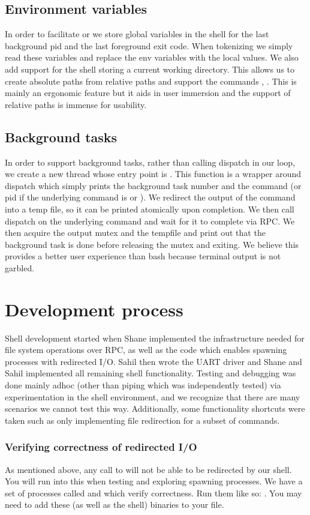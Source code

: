 \subsection{Environment variables}
In order to facilitate \cl{$!} or  we store global variables in the shell for the last background
pid and the last foreground exit code. When tokenizing we simply read these variables and replace the env variables
with the local values. We also add support for the shell storing a current working directory. This allows us
to create absolute paths from relative paths and support the commands , . This is 
mainly an ergonomic feature but it aids in user immersion and the support of relative paths is immense for 
usability. 


\subsection{Background tasks}
\label{sec:background-tasks}
In order to support background tasks, rather than calling dispatch in our loop, we create a new thread whose 
entry point is . This function is a wrapper around dispatch which simply prints 
the background task number and the command (or pid if the underlying command is  or ).
We redirect the output of the command into a temp file, so it can be printed atomically upon completion. We
then call dispatch on the underlying command and wait for it to complete via RPC. We then acquire the output mutex and  the tempfile
and print out that the background task is done before releasing the mutex and exiting. We believe this provides
a better user experience than bash because terminal output is not garbled.

\section{Development process}
Shell development started when Shane implemented the infrastructure needed for file system 
operations over RPC, as well as the code which enables spawning processes with redirected I/O. Sahil
then wrote the UART driver and Shane and Sahil implemented all remaining shell functionality. Testing 
and debugging was done mainly adhoc (other than piping which was independently tested) via experimentation
in the shell environment, and we recognize
that there are many scenarios we cannot test this way. Additionally, some functionality shortcuts were taken such as
only implementing file redirection for a subset of commands. 

\subsubsection{Verifying correctness of redirected I/O}
As mentioned above, any call to 
 will not be able to be redirected by our shell. You will run into this when 
testing and exploring spawning processes. We have a set of processes called 
and  which verify correctness. Run them like so: .
You may need to add these (as well as the shell) binaries to your  file.